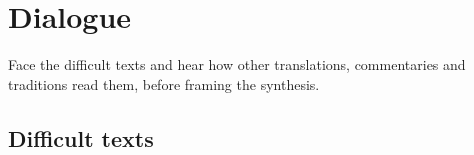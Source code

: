 \chapter{Dialogue}

\begin{objetivo}
Face the difficult texts and hear how other translations, commentaries and
traditions read them, before framing the synthesis.
\end{objetivo}

\section{Difficult texts}
\textosdotema[peso=dificil]

